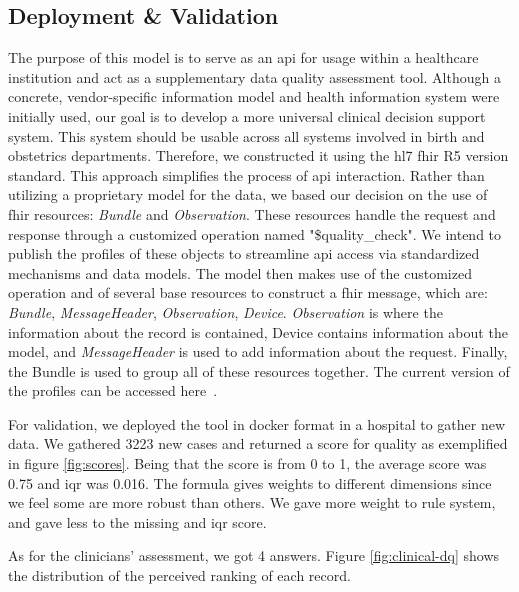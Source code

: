 \subsection{Deployment \& Validation}

The purpose of this model is to serve as an \ac{api} for usage within a healthcare institution and act as a supplementary data quality assessment tool. Although a concrete, vendor-specific information model and health information system were initially used, our goal is to develop a more universal clinical decision support system. This system should be usable across all systems involved in birth and obstetrics departments. Therefore, we constructed it using the \ac{hl7} \ac{fhir} R5 version standard. This approach simplifies the process of \ac{api} interaction. Rather than utilizing a proprietary model for the data, we based our decision on the use of \ac{fhir} resources: \textit{Bundle} and \textit{Observation}. These resources handle the request and response through a customized operation named "\$quality\_check". We intend to publish the profiles of these objects to streamline \ac{api} access via standardized mechanisms and data models. The model then makes use of the customized operation and of several base resources to construct a \ac{fhir} message, which are: \textit{Bundle}, \textit{MessageHeader}, \textit{Observation}, \textit{Device}. \textit{Observation} is where the information about the record is contained, Device contains information about the model, and \textit{MessageHeader} is used to add information about the request. Finally, the Bundle is used to group all of these resources together. The current version of the profiles can be accessed here\unskip~\cite{almeidaObstetricsClinicalDecision}. 

For validation, we deployed the tool in docker format in a hospital to gather new data. We gathered 3223 new cases and returned a score for quality as exemplified in figure \ref{fig:scores}. Being that the score is from 0 to 1, the average score was 0.75 and \ac{iqr} was 0.016. The formula gives weights to different dimensions since we feel some are more robust than others. We gave more weight to rule system, and gave less to the missing and \ac{iqr} score.

As for the clinicians' assessment, we got 4 answers. Figure \ref{fig:clinical-dq} shows the distribution of the perceived ranking of each record.


